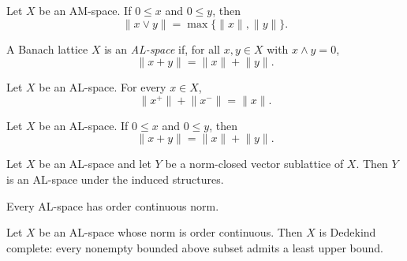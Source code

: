 \begin{theorem}
\label{thm:amSpace-norm-sup-eq-max-of-nonneg}
\leanok
{}
Let $X$ be an AM-space. If $0 \le x$ and $0 \le y$, then
\[
  \lVert x \vee y\rVert = \max\{\lVert x\rVert,\lVert y\rVert\}.
\]
\end{theorem}

\begin{definition}
\label{def:al-space}
\leanok
{}
A Banach lattice $X$ is an \emph{AL-space} if, for all $x, y \in X$
with $x \wedge y = 0$,
\[
  \lVert x + y\rVert = \lVert x\rVert + \lVert y\rVert.
\]
\end{definition}

\begin{lemma}
\label{lem:alSpace-norm-posPart-add-norm-negPart}
\leanok
{}
Let $X$ be an AL-space. For every $x \in X$,
\[
  \lVert x^{+}\rVert + \lVert x^{-}\rVert = \lVert x\rVert.
\]
\end{lemma}

\begin{theorem}
\label{thm:alSpace-norm-add-eq-of-nonneg}
\leanok
{}
Let $X$ be an AL-space. If $0 \le x$ and $0 \le y$, then
\[
  \lVert x + y\rVert = \lVert x\rVert + \lVert y\rVert.
\]
\end{theorem}

\begin{lemma}
\label{lem:alSpace-closed-sublattice}
\leanok
{}
Let $X$ be an AL-space and let $Y$ be a norm-closed vector
sublattice of $X$. Then $Y$ is an AL-space under the induced
structures.
\end{lemma}

\begin{theorem}
\label{thm:alSpace-isOrderContinuousNorm}
\leanok
{}
Every AL-space has order continuous norm.
\end{theorem}

\begin{theorem}
\label{thm:alSpace-conditionallyCompleteLattice}
\leanok
{}
Let $X$ be an AL-space whose norm is order continuous. Then $X$ is
Dedekind complete: every nonempty bounded above subset admits a
least upper bound.
\end{theorem}

